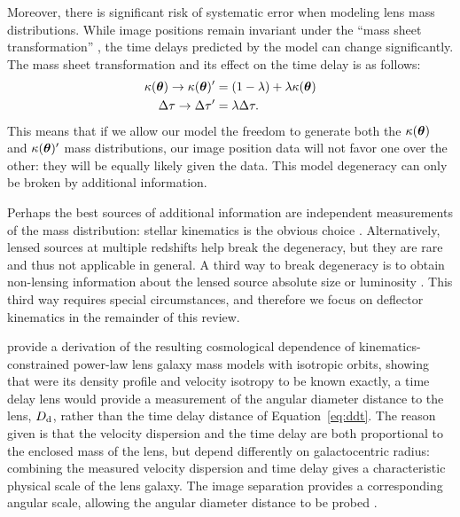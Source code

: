 Moreover, there is significant risk of systematic error when modeling
lens mass distributions. While image positions remain invariant under
the ``mass sheet transformation'' \citep{FGS85,S+S13}
\citep[and its generalization, the source-position transformation][]{SPT}, the time delays
predicted by the model can change significantly. The mass sheet transformation
and its effect on the time delay is as follows:
%
\begin{align}
    \kappa(\boldsymbol{\theta}) \rightarrow \kappa(\boldsymbol{\theta})' &= (1 - \lambda) + \lambda \kappa(\boldsymbol{\theta})  \label{eq:mst} \\
    \Delta \tau \rightarrow \Delta \tau' &= \lambda \Delta \tau.
\end{align}
%
This means that if we allow our model the freedom to generate both the
$\kappa(\boldsymbol{\theta})$ and $\kappa(\boldsymbol{\theta})'$ mass distributions, our image position
data will not favor one over the other: they will be equally likely
given the data. This model degeneracy can only be broken by additional
information.

Perhaps the best sources of additional information are independent
measurements of the mass distribution: stellar kinematics is the
obvious choice \citep{Koo++03}. Alternatively, lensed sources at
multiple redshifts help break the degeneracy, but they are rare
\citep{Gav++08,Son++12} and thus not applicable in general. A third
way to break degeneracy is to obtain non-lensing information about the
lensed source absolute size \citep{SBL11} or luminosity
\citep{Hol01}. This third way requires special circumstances, and therefore
we focus on deflector kinematics in the remainder of this review.

\citet{JeeKomatsuSuyu2015} provide a derivation of the resulting
cosmological dependence of kinematics-constrained power-law lens
galaxy mass models with isotropic orbits, showing that were its
density profile and velocity isotropy to be known exactly, a time
delay lens would provide a measurement of the angular diameter
distance to the lens, $D_{\rm d}$, rather than the time delay distance of
Equation~\ref{eq:ddt}. The reason given is that the velocity
dispersion and the time delay are both proportional to the enclosed
mass of the lens, but depend differently on galactocentric radius:
combining the measured velocity dispersion and time delay gives a
characteristic physical scale of the lens galaxy.  The image
separation provides a corresponding angular scale, allowing the
angular diameter distance to be probed \citep[see earlier work
by][]{GLB08}.

